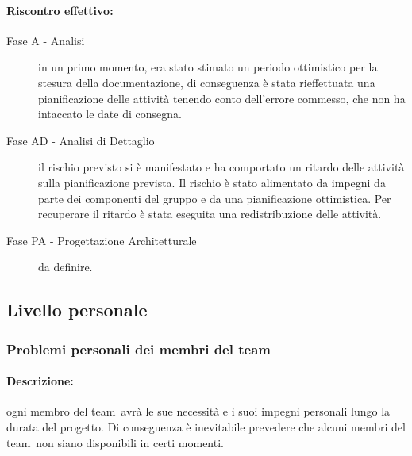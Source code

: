 \documentclass[../PianoProgetto.tex]{subfiles}
\begin{document}
	\paragraph*{Riscontro effettivo:} 
		\begin{description}
			\item[Fase A - Analisi] in un primo momento, era stato stimato un periodo ottimistico per la stesura della documentazione, di conseguenza è stata rieffettuata una pianificazione delle attività tenendo conto dell'errore commesso, che non ha intaccato le date di consegna.
			\item[Fase AD - Analisi di Dettaglio] il rischio previsto si è manifestato e ha comportato un ritardo delle attività sulla pianificazione prevista. Il rischio è stato alimentato da impegni da parte dei componenti del gruppo e da una pianificazione ottimistica. Per recuperare il ritardo è stata eseguita una redistribuzione delle attività.
			\item[Fase PA - Progettazione Architetturale] da definire.
		\end{description}
		

\newpage
\subsection{Livello personale}

\subsubsection{Problemi personali dei membri del team}
\label{sec:Problemi personali dei membri del team}

	\paragraph*{Descrizione:} ogni membro del team\g\ avrà le sue necessità e i suoi impegni personali lungo la durata del progetto. Di conseguenza è inevitabile prevedere che alcuni membri del team\g\ non siano disponibili in certi momenti.
	 
	
\end{document}
